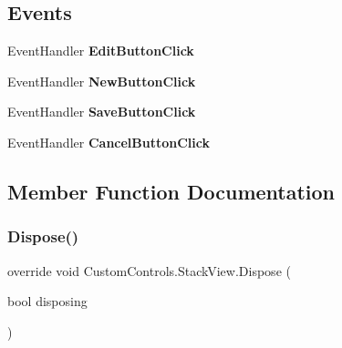 \subsection*{Events}
\begin{DoxyCompactItemize}
\item 
\mbox{\label{class_custom_controls_1_1_stack_view_a63d3aaa67d3d681a55e44abfdc1e18a8}} 
Event\+Handler {\bfseries Edit\+Button\+Click}
\item 
\mbox{\label{class_custom_controls_1_1_stack_view_af19003ef6d5198e763c656b624c3fbbc}} 
Event\+Handler {\bfseries New\+Button\+Click}
\item 
\mbox{\label{class_custom_controls_1_1_stack_view_a6086b716160faebc479c3a407092a7d5}} 
Event\+Handler {\bfseries Save\+Button\+Click}
\item 
\mbox{\label{class_custom_controls_1_1_stack_view_a19d78699d1abcd1c49f4941b58f76800}} 
Event\+Handler {\bfseries Cancel\+Button\+Click}
\end{DoxyCompactItemize}


\subsection{Member Function Documentation}
\mbox{\label{class_custom_controls_1_1_stack_view_a227a09aebaaa2cc577a4bfa50cb08967}} 
\subsubsection{\texorpdfstring{Dispose()}{Dispose()}}
{\footnotesize\ttfamily override void Custom\+Controls.\+Stack\+View.\+Dispose (\begin{DoxyParamCaption}\item[{bool}]{disposing }\end{DoxyParamCaption})\hspace{0.3cm}{\ttfamily [protected]}}



